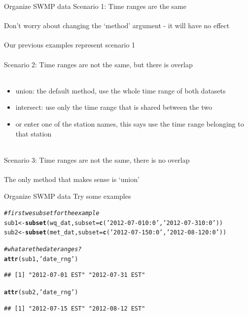 \documentclass[xcolor=svgnames]{beamer}\usepackage[]{graphicx}\usepackage[]{color}
\makeatletter
\newcommand{\hlstr}[1]{\textcolor[rgb]{0.192,0.494,0.8}{#1}}%
\newcommand{\hlcom}[1]{\textcolor[rgb]{0.678,0.584,0.686}{\textit{#1}}}%
\newcommand{\hlstd}[1]{\textcolor[rgb]{0.345,0.345,0.345}{#1}}%
\newcommand{\hlkwb}[1]{\textcolor[rgb]{0.69,0.353,0.396}{#1}}%
\newcommand{\hlkwc}[1]{\textcolor[rgb]{0.333,0.667,0.333}{#1}}%
\newcommand{\hlkwd}[1]{\textcolor[rgb]{0.737,0.353,0.396}{\textbf{#1}}}%
\newenvironment{kframe}{%
 \def\at@end@of@kframe{}%
 \ifinner\ifhmode%
  \def\at@end@of@kframe{\end{minipage}}%
  \begin{minipage}{\columnwidth}%
 \fi\fi%
 \def\FrameCommand##1{\hskip\@totalleftmargin \hskip-\fboxsep
 \colorbox{shadecolor}{##1}\hskip-\fboxsep
     \hskip-\linewidth \hskip-\@totalleftmargin \hskip\columnwidth}%
 \MakeFramed {\advance\hsize-\width
   \@totalleftmargin\z@ \linewidth\hsize
   \@setminipage}}%
 {\par\unskip\endMakeFramed%
 \at@end@of@kframe}
\newenvironment{knitrout}{}{} %
\makeatother
\begin{document}
\begin{frame}{Organize SWMP data}
\onslide<+->
\alert{Scenario 1}: Time ranges are the same \\~\\
Don't worry about changing the `method' argument - it will have no effect\\~\\
Our previous examples represent scenario 1 \\~\\
\onslide<+->
\alert{Scenario 2}: Time ranges are not the same, but there is overlap \\~\\
\begin{itemize}
\item union: the default method, use the whole time range of both datasets
\item intersect: use only the time range that is shared between the two
\item or enter one of the station names, this says use the time range belonging to that station\\~\\
\end{itemize}
\onslide<+->
\alert{Scenario 3}: Time ranges are not the same, there is no overlap \\~\\
The only method that makes sense is `union'
\end{frame}

\begin{frame}[containsverbatim]{Organize SWMP data}
Try some examples
\begin{knitrout}\scriptsize
{}\color{fgcolor}\begin{kframe}
\begin{alltt}
\hlcom{# first we subset for the example}
\hlstd{sub1} \hlkwb{<-} \hlkwd{subset}\hlstd{(wq_dat,} \hlkwc{subset} \hlstd{=} \hlkwd{c}\hlstd{(}\hlstr{'2012-07-01 0:0'}\hlstd{,} \hlstr{'2012-07-31 0:0'}\hlstd{))}
\hlstd{sub2} \hlkwb{<-} \hlkwd{subset}\hlstd{(met_dat,} \hlkwc{subset} \hlstd{=} \hlkwd{c}\hlstd{(}\hlstr{'2012-07-15 0:0'}\hlstd{,} \hlstr{'2012-08-12 0:0'}\hlstd{))}

\hlcom{# what are the date ranges?}
\hlkwd{attr}\hlstd{(sub1,} \hlstr{'date_rng'}\hlstd{)}
\end{alltt}
\begin{verbatim}
## [1] "2012-07-01 EST" "2012-07-31 EST"
\end{verbatim}
\begin{alltt}
\hlkwd{attr}\hlstd{(sub2,} \hlstr{'date_rng'}\hlstd{)}
\end{alltt}
\begin{verbatim}
## [1] "2012-07-15 EST" "2012-08-12 EST"
\end{verbatim}
\end{kframe}
\end{knitrout}
\end{frame}
\end{document}
